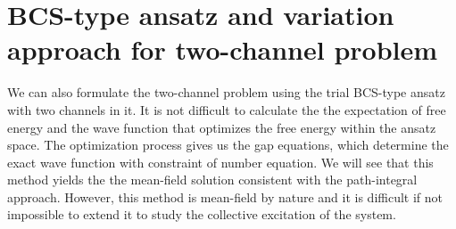 \chapter{BCS-type ansatz and variation approach for two-channel problem \label{ch:mean}}
We can also formulate the two-channel problem  using the trial BCS-type ansatz with two channels in it.  It is not difficult to calculate the the expectation of free energy and  the wave function that optimizes the free energy within the ansatz space.  The optimization process gives us the gap equations, which determine the exact wave function with constraint of number equation.   %
We will see that this method yields the the mean-field solution consistent with the path-integral approach.  However, this method is mean-field by nature and it is difficult if not impossible to extend it to study the collective excitation of the system.  

